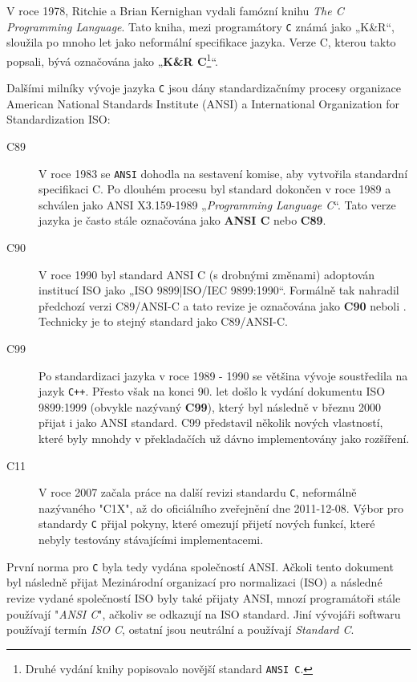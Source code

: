     V roce 1978, Ritchie a Brian Kernighan vydali famózní knihu \emph{The C Programming Language}. 
    Tato kniha, mezi programátory \texttt{C} známá jako „K\&R“, sloužila po mnoho let jako 
    neformální specifikace jazyka. Verze C, kterou takto popsali, bývá označována jako 
    „\textbf{K\&R C}\footnote{Druhé vydání knihy popisovalo novější standard \texttt{ANSI C}.}“.
                        
    Dalšími milníky vývoje jazyka \texttt{C} jsou dány standardizačnímy procesy organizace American 
    National Standards Institute (ANSI) a International Organization for Standardization ISO:
    \begin{description}
      \item[C89]    V roce 1983 se \texttt{ANSI} dohodla na sestavení komise, aby vytvořila 
                    standardní specifikaci C. Po dlouhém procesu byl standard dokončen v roce 1989 
                    a schválen jako ANSI X3.159-1989 „\emph{Programming Language C}“. Tato verze 
                    jazyka je často stále označována jako \textbf{ANSI C} nebo \textbf{C89}.
      \item[C90]    V roce 1990 byl standard ANSI C (s drobnými změnami) adoptován institucí ISO 
                    jako „ISO 9899|ISO/IEC 9899:1990“. Formálně tak nahradil předchozí verzi 
                    C89/ANSI-C a tato revize je označována jako \textbf{C90} neboli . 
                    Technicky je to stejný standard jako C89/ANSI-C.
      \item[C99]    Po standardizaci jazyka v roce 1989 - 1990 se většina vývoje soustředila na 
                    jazyk \texttt{C++}. Přesto však na konci 90. let došlo k vydání dokumentu ISO 
                    9899:1999 (obvykle nazývaný \textbf{C99}), který byl následně v březnu 2000 
                    přijat i jako ANSI standard. C99 představil několik nových vlastností, které 
                    byly mnohdy v překladačích už dávno implementovány jako rozšíření.
      \item[C11]    V roce 2007 začala práce na další revizi standardu \texttt{C}, neformálně 
                    nazývaného "C1X", až do oficiálního zveřejnění dne 2011-12-08. Výbor pro 
                    standardy \texttt{C} přijal pokyny, které omezují přijetí nových funkcí, které 
                    nebyly testovány stávajícími implementacemi.
    \end{description}
    
    \begin{note}
      První norma pro \texttt{C} byla tedy vydána společností ANSI. Ačkoli tento dokument byl 
      následně přijat Mezinárodní organizací pro normalizaci (ISO) a následné revize vydané 
      společností ISO byly také přijaty ANSI, mnozí programátoři stále používají "\emph{ANSI C}", 
      ačkoliv se odkazují na ISO standard. Jiní vývojáři softwaru používají termín \emph{ISO C}, 
      ostatní jsou neutrální a používají \emph{Standard C}.
    \end{note}
  
